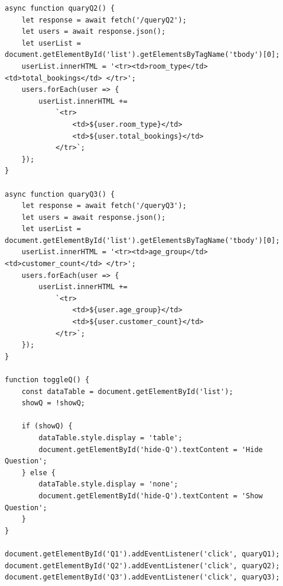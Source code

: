 \documentclass{report}
\begin{document}
\begin{verbatim}
async function quaryQ2() {
    let response = await fetch('/queryQ2');
    let users = await response.json();
    let userList = document.getElementById('list').getElementsByTagName('tbody')[0];
    userList.innerHTML = '<tr><td>room_type</td> <td>total_bookings</td> </tr>'; 
    users.forEach(user => {
        userList.innerHTML +=                 
            `<tr> 
                <td>${user.room_type}</td> 
                <td>${user.total_bookings}</td> 
            </tr>`;
    });
}

async function quaryQ3() {
    let response = await fetch('/queryQ3');
    let users = await response.json();
    let userList = document.getElementById('list').getElementsByTagName('tbody')[0];
    userList.innerHTML = '<tr><td>age_group</td> <td>customer_count</td> </tr>'; 
    users.forEach(user => {
        userList.innerHTML +=                 
            `<tr> 
                <td>${user.age_group}</td> 
                <td>${user.customer_count}</td> 
            </tr>`;
    });
}

function toggleQ() {
    const dataTable = document.getElementById('list');
    showQ = !showQ;

    if (showQ) {
        dataTable.style.display = 'table'; 
        document.getElementById('hide-Q').textContent = 'Hide Question';
    } else {
        dataTable.style.display = 'none';
        document.getElementById('hide-Q').textContent = 'Show Question'; 
    }
}

document.getElementById('Q1').addEventListener('click', quaryQ1);
document.getElementById('Q2').addEventListener('click', quaryQ2);
document.getElementById('Q3').addEventListener('click', quaryQ3);
\end{verbatim}
\end{document}
